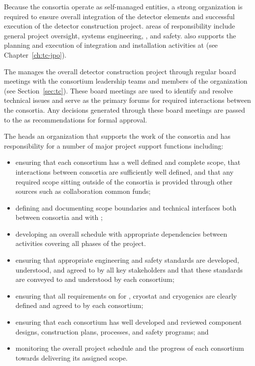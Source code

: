 Because the consortia operate as self-managed entities, a strong
 organization is required to ensure overall integration 
of the detector elements and successful execution of the detector
construction project.   areas of responsibility include 
general project oversight, systems engineering, , and 
safety.   also supports the planning and execution 
of integration and installation activities at  (see 
Chapter~\ref{ch:tc-jpo}).  

The  manages the overall detector construction project
through regular board meetings with the consortium leadership teams 
and members of the  organization (see Section~\ref{sec:tc}).  
These board meetings are used to identify and resolve technical issues
and serve as the primary forums for required interactions between the 
consortia. Any decisions generated through these board meetings are passed to 
the   as recommendations for formal approval.

The  heads an organization that supports the work of 
the consortia and has responsibility for a number of major project 
support functions including:
\begin{itemize}
\item ensuring that each consortium has a well defined and complete
  scope, that interactions between consortia are sufficiently 
  well defined, and that any required scope sitting outside of the 
  consortia is provided through other sources such as collaboration
  common funds;
\item defining and documenting scope boundaries and technical 
  interfaces both between consortia and with ;  
\item developing an overall schedule with appropriate dependencies
  between activities covering all phases of the project. 
\item ensuring that appropriate engineering and safety standards 
  are developed, understood, and agreed to by all key stakeholders 
  and that these standards are conveyed to and understood by each
  consortium;
\item ensuring that all  requirements on  
  for , cryostat and cryogenics are clearly defined and 
  agreed to by each consortium;
\item ensuring that each consortium has well developed and reviewed
  component designs, construction plans,  processes, and 
  safety programs; and
\item monitoring the overall project schedule and the progress of 
  each consortium towards delivering its assigned scope. 
\end{itemize}

